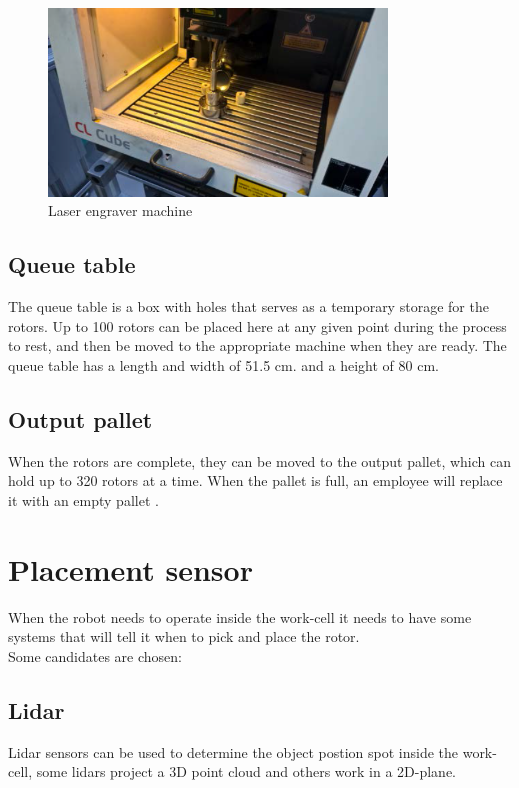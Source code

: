   \begin{figure}[h]
    \centering
    \includegraphics[width=9cm]{InitialProblemstatement/Case/engrave.PNG}
    \caption{Laser engraver machine\cite{Case}}
    \label{fig:Laserengravermachine}
  \end{figure}
  
 \subsection{Queue table}
 The queue table is a box with holes that serves as a temporary storage for the rotors. Up to 100 rotors can be placed here at any given point during the process to rest, and then be moved to the appropriate machine when they are ready. The queue table has a length and width of 51.5 cm. and a height of 80 cm\cite{Case}.\\  
 
 \subsection{Output pallet}
 When the rotors are complete, they can be moved to the output pallet, which can hold up to 320 rotors at a time. When the pallet is full, an employee will replace it with an empty pallet \cite{Case}.\\ 
 
 \section{Placement sensor}\label{ref:PlacementS}
 
 When the robot needs to operate inside the work-cell it needs to have some systems that will tell it when to pick and place the rotor.\\
 Some candidates are chosen:\\

 
  \subsection{Lidar} 
  Lidar sensors can be used to determine the object postion spot inside the work-cell, some lidars project a 3D point cloud and others work in a 2D-plane\cite{Lidar}.\\

